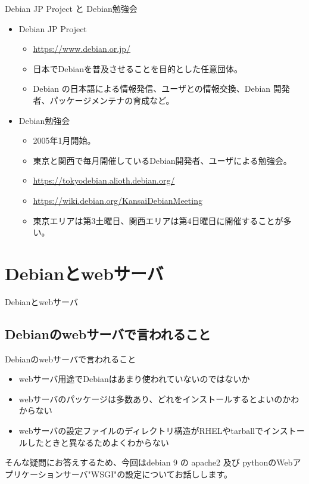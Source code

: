\begin{frame}{Debian JP Project と Debian勉強会}
  \begin{itemize}
  \item Debian JP Project
    \begin{itemize}
    \item \url{https://www.debian.or.jp/}
    \item 日本でDebianを普及させることを目的とした任意団体。
    \item Debian の日本語による情報発信、ユーザとの情報交換、Debian 開発者、パッケージメンテナの育成など。
    \end{itemize}
  \item Debian勉強会
    \begin{itemize}
    \item 2005年1月開始。
    \item 東京と関西で毎月開催しているDebian開発者、ユーザによる勉強会。
    \item \url{https://tokyodebian.alioth.debian.org/}
    \item \url{https://wiki.debian.org/KansaiDebianMeeting}
    \item 東京エリアは第3土曜日、関西エリアは第4日曜日に開催することが多い。
    \end{itemize}
  \end{itemize}
\end{frame}


\section{Debianとwebサーバ}

\begin{frame}
  \begin{center}\Huge{Debianとwebサーバ}\end{center}
\end{frame}


\subsection{Debianのwebサーバで言われること}

\begin{frame}{Debianのwebサーバで言われること}%
  
\begin{itemize}
\item webサーバ用途でDebianはあまり使われていないのではないか
\item webサーバのパッケージは多数あり、どれをインストールするとよいのかわからない
\item webサーバの設定ファイルのディレクトリ構造がRHELやtarballでインストールしたときと異なるためよくわからない
\end{itemize}

そんな疑問にお答えするため、今回はdebian 9 の apache2 及び pythonのWebアプリケーションサーバ"WSGI"の設定についてお話しします。

\end{frame}


